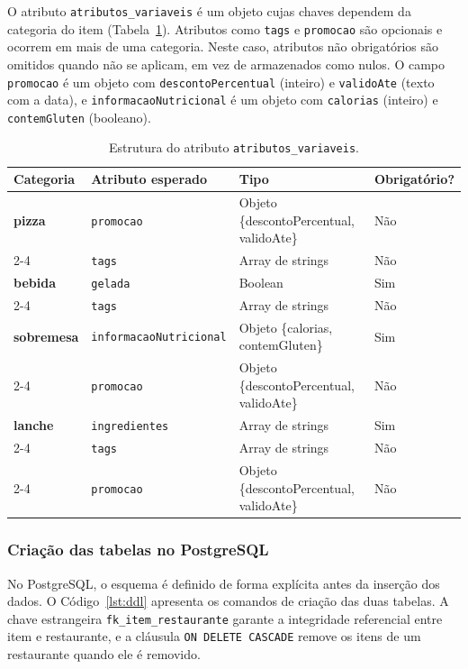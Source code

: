 O atributo \texttt{atributos\_variaveis} é um objeto cujas chaves dependem da categoria do item 
(Tabela~\ref{tab:jsonb-atributos}). Atributos como \texttt{tags} e \texttt{promocao} são opcionais e ocorrem em mais de uma categoria. 
Neste caso, atributos não obrigatórios são omitidos quando não se aplicam, em vez de armazenados como nulos. O campo \texttt{promocao} é um objeto com \texttt{descontoPercentual} (inteiro) e \texttt{validoAte}
(texto com a data), e \texttt{informacaoNutricional} é um objeto com \texttt{calorias} (inteiro) e
\texttt{contemGluten} (booleano).

\begin{table}[H]
\centering
\renewcommand{\arraystretch}{1.1}
\caption{Estrutura do atributo \texttt{atributos\_variaveis}.}
\label{tab:jsonb-atributos}
\small
\begin{tabular}{|l|l|l|l|}
\hline
\textbf{Categoria} & \textbf{Atributo esperado} & \textbf{Tipo} & \textbf{Obrigatório?} \\ \hline
\textbf{pizza} & \texttt{promocao} & Objeto \{descontoPercentual, validoAte\} & Não \\ \cline{2-4}
 & \texttt{tags} & Array de strings & Não \\ \hline
\textbf{bebida} & \texttt{gelada} & Boolean & Sim \\ \cline{2-4}
 & \texttt{tags} & Array de strings & Não \\ \hline
\textbf{sobremesa} & \texttt{informacaoNutricional} & Objeto \{calorias, contemGluten\} & Sim \\ \cline{2-4}
 & \texttt{promocao} & Objeto \{descontoPercentual, validoAte\} & Não \\ \hline
\textbf{lanche} & \texttt{ingredientes} & Array de strings & Sim \\ \cline{2-4}
 & \texttt{tags} & Array de strings & Não \\ \cline{2-4}
 & \texttt{promocao} & Objeto \{descontoPercentual, validoAte\} & Não \\ \hline
\end{tabular}
\vspace{0.4em}
\end{table}

\subsubsection{Criação das tabelas no PostgreSQL}

No PostgreSQL, o esquema é definido de forma explícita antes da inserção dos dados. O Código~\ref{lst:ddl} apresenta os comandos de criação das duas tabelas. A chave estrangeira \texttt{fk\_item\_restaurante} garante a integridade referencial entre item e restaurante, e a cláusula \texttt{ON DELETE CASCADE} remove os itens de um restaurante quando ele é removido.

